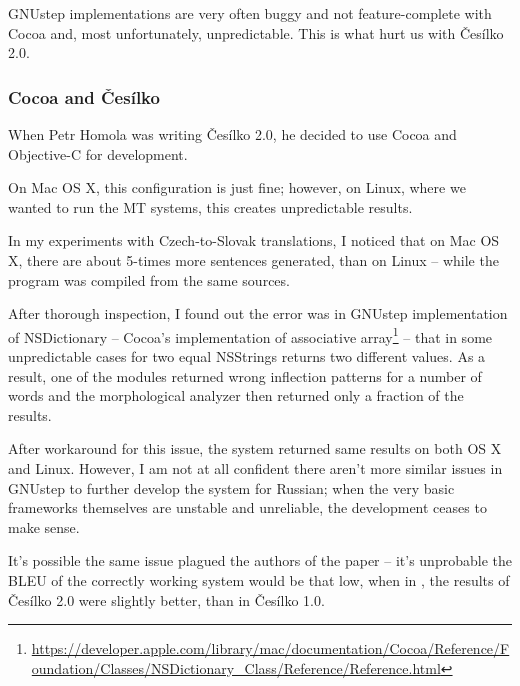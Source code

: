 GNUstep implementations are very often buggy and not feature-complete with Cocoa and, most unfortunately, unpredictable. This is what hurt us with Česílko 2.0.

\subsubsection{Cocoa and Česílko}
When Petr Homola was writing Česílko 2.0, he decided to use Cocoa and Objective-C for development.

On Mac OS X, this configuration is just fine; however, on Linux, where we wanted to run the MT systems, this creates unpredictable results.

In my experiments with Czech-to-Slovak translations, I noticed that on Mac OS X, there are about 5-times more sentences generated, than on Linux -- while the program was compiled from the same sources.

After thorough inspection, I found out the error was in GNUstep implementation of NSDictionary -- Cocoa's implementation of associative array\footnote{\url{https://developer.apple.com/library/mac/documentation/Cocoa/Reference/Foundation/Classes/NSDictionary\_Class/Reference/Reference.html}} -- that in some unpredictable cases for two equal NSStrings returns two different values. As a result, one of the modules returned wrong inflection patterns for a number of words and the morphological analyzer then returned only a fraction of the results.

After workaround for this issue, the system returned same results on both OS X and Linux. However, I am not at all confident there aren't more similar issues in GNUstep to further develop the system for Russian; when the very basic frameworks themselves are unstable and unreliable, the development ceases to make sense.

It's possible the same issue plagued the authors of the paper \cite{evalquality_cesilko} -- it's unprobable the BLEU of the correctly working system would be that low, when in \cite{cesilko2}, the results of Česílko 2.0 were slightly better, than in Česílko 1.0. 
